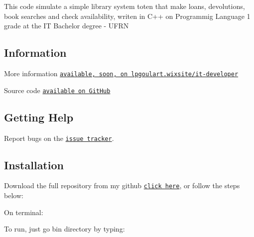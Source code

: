 This code simulate a simple library system toten that make loans, devolutions, book searches and check availability, writen in C++ on Programmig Language 1 grade at the IT Bachelor degree -\/ U\+F\+RN

\subsection*{Information}


\begin{DoxyItemize}
\item More information \href{https://lpgoulart.wixsite.com/it-developer}{\tt available, soon, on lpgoulart.\+wixsite/it-\/developer}
\item Source code \href{https://github.com/lpgoulart/Library}{\tt available on Git\+Hub}
\end{DoxyItemize}

\subsection*{Getting Help}


\begin{DoxyItemize}
\item Report bugs on the \href{https://github.com/lpgoulart/Library/issues}{\tt issue tracker}.
\end{DoxyItemize}

\subsection*{Installation}


\begin{DoxyItemize}
\item Download the full repository from my github \href{https://github.com/lpgoulart/Library}{\tt click here}, or follow the steps below\+:
\item On terminal\+:
\end{DoxyItemize}





\begin{DoxyItemize}
\item To run, just go bin directory by typing\+:
\end{DoxyItemize}


